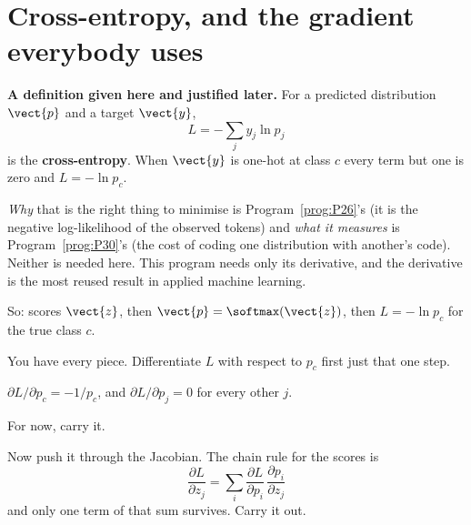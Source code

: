 \section{Cross-entropy, and the gradient everybody uses}
\label{sec:P18-cross-entropy}

\begin{fr}
\begin{note}
\textbf{A definition given here and justified later.} For a predicted
distribution $\vect{p}$ and a target $\vect{y}$,
\[ L = -\sum_j y_j \ln p_j \]
is the \textbf{cross-entropy}. When $\vect{y}$ is one-hot at class $c$ every
term but one is zero and $L = -\ln p_c$.

\emph{Why} that is the right thing to minimise is
Program~\ref{prog:P26}'s (it is the negative log-likelihood of the observed
tokens) and \emph{what it measures} is Program~\ref{prog:P30}'s (the cost of
coding one distribution with another's code). Neither is needed here. This
program needs only its derivative, and the derivative is the most reused
result in applied machine learning.
\end{note}
\end{fr}

\begin{fr}
So: scores $\vect{z}$, then $\vect{p} = \softmax(\vect{z})$, then
$L = -\ln p_c$ for the true class $c$.

You have every piece. Differentiate $L$ with respect to $p_c$ first \dash{}
just that one step.
\nextframe
\end{fr}

\begin{fr}
\begin{ansblock}
$\partial L/\partial p_c = -1/p_c$, and $\partial L / \partial p_j = 0$ for
every other $j$.
\end{ansblock}

For now, carry it.

Now push it through the Jacobian. The chain rule for the scores is
\[ \frac{\partial L}{\partial z_j}
   = \sum_i \frac{\partial L}{\partial p_i}\,
     \frac{\partial p_i}{\partial z_j} \]
and only one term of that sum survives. Carry it out.
\dotline
\nextframe
\end{fr}

